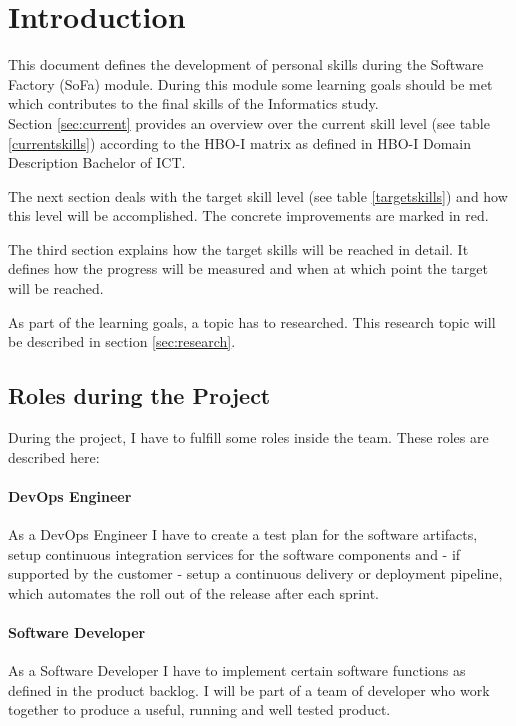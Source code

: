\section{Introduction}
\label{sec:intro}

This document defines the development of personal skills during the Software Factory (SoFa) module.
During this module some learning goals should be met which contributes to the final skills of the Informatics study.
~\\
Section \ref{sec:current} provides an overview over the current skill level (see table \ref{currentskills}) according to the HBO-I matrix as defined in \glqq HBO-I Domain Description Bachelor of ICT\grqq.

The next section deals with the target skill level (see table \ref{targetskills}) and how this level will be accomplished. The concrete improvements are marked in red.

The third section explains how the target skills will be reached in detail. It defines how the progress will be measured and when at which point the target will be reached.

As part of the learning goals, a topic has to researched. This research topic will be described in section \ref{sec:research}.

\subsection{Roles during the Project}

During the project, I have to fulfill some roles inside the team. These roles are described here:

\paragraph{DevOps Engineer} As a DevOps Engineer I have to create a test plan for the software artifacts, setup continuous integration services for the software components and - if supported by the customer - setup a continuous delivery or deployment pipeline, which automates the roll out of the release after each sprint.

\paragraph{Software Developer} As a Software Developer I have to implement certain software functions as defined in the product backlog. I will be part of a team of developer who work together to produce a useful, running and well tested product.

